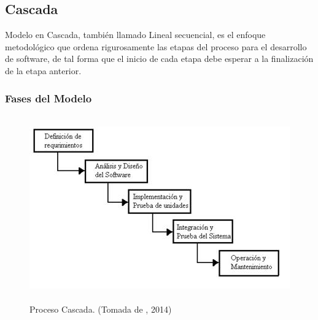 
\pagebreak
\subsection{Cascada}

Modelo en Cascada, también llamado Lineal secuencial, es el enfoque metodológico que ordena rigurosamente las etapas del proceso para el desarrollo de software, de tal forma que el inicio de cada etapa debe esperar a la finalización de la etapa anterior. 

\subsubsection{Fases del Modelo}

\begin{figure}[H]
\begin{center}
	\includegraphics[width=13cm,height=8cm]{img/cascada.jpg}
\end{center}
\caption{Proceso Cascada. (Tomada de , 2014)}
\label{fig:Casacada}
\end{figure}

